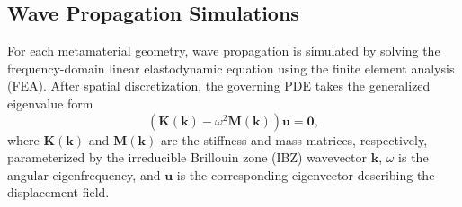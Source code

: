 \documentclass[preprint,review,12pt]{elsarticle}
\begin{document}
\subsection{Wave Propagation Simulations} 
\label{ssec:wave_propagration_simulations}

For each metamaterial geometry, wave propagation is simulated by solving the frequency-domain linear elastodynamic equation using the finite element analysis (FEA). After spatial discretization, the governing PDE takes the generalized eigenvalue form
\begin{equation}
\label{eqn:wave_fuction}
\left( \mathbf{K}(\mathbf{k}) - \omega^2 \mathbf{M}(\mathbf{k}) \right) \mathbf{u} = \mathbf{0},
\end{equation}
where $\mathbf{K}(\mathbf{k})$ and $\mathbf{M}(\mathbf{k})$ are the stiffness and mass matrices, respectively, parameterized by the irreducible Brillouin zone (IBZ) wavevector $\mathbf{k}$, $\omega$ is the angular eigenfrequency, and $\mathbf{u}$ is the corresponding eigenvector describing the displacement field.

\end{document}
